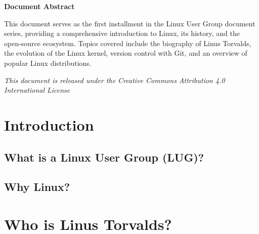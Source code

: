 

\renewcommand{\lugsessionnumber}{1}
\renewcommand{\lugsessiontitle}{Introduction to Linux and Open Source}
\renewcommand{\lugsessiondate}{\today}
\renewcommand{\lugsessiondescription}{Session Description}


    \lugdocumentbegin

	\begin{center}
		\colorbox{luglight}{
			\begin{minipage}{0.8\textwidth}
				\centering
				\vspace{0.5cm}
				\Large\textbf{Document Abstract}
				\vspace{0.3cm}
				
				\normalsize
				This document serves as the first installment in the Linux User Group document series, providing a comprehensive introduction to Linux, its history, and the open-source ecosystem. Topics covered include the biography of Linus Torvalds, the evolution of the Linux kernel, version control with Git, and an overview of popular Linux distributions.
				\vspace{0.5cm}
			\end{minipage}
		}
	\end{center}
	
	\vfill
	
	\begin{center}
		\small\textit{This document is released under the Creative Commons Attribution 4.0 International License}
	\end{center}
	
	\newpage

	
	
	\section{Introduction}
	\subsection{What is a Linux User Group (LUG)?}
	\subsection{Why Linux?}
	
	\section{Who is Linus Torvalds?}
